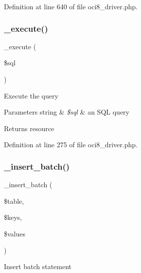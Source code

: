 Definition at line 640 of file oci8\+\_\+driver.\+php.

\mbox{\label{class_c_i___d_b__oci8__driver_a114ab675d89bf8324a41785fb475e86d}} 
\subsubsection{\texorpdfstring{\_execute()}{\_execute()}}
{\footnotesize\ttfamily \+\_\+execute (\begin{DoxyParamCaption}\item[{}]{\$sql }\end{DoxyParamCaption})\hspace{0.3cm}{\ttfamily [protected]}}

Execute the query


\begin{DoxyParams}[1]{Parameters}
string & {\em \$sql} & an S\+QL query \\
\hline
\end{DoxyParams}
\begin{DoxyReturn}{Returns}
resource 
\end{DoxyReturn}


Definition at line 275 of file oci8\+\_\+driver.\+php.

\mbox{\label{class_c_i___d_b__oci8__driver_a1978e1358c812587a46e242630365099}} 
\subsubsection{\texorpdfstring{\_insert\_batch()}{\_insert\_batch()}}
{\footnotesize\ttfamily \+\_\+insert\+\_\+batch (\begin{DoxyParamCaption}\item[{}]{\$table,  }\item[{}]{\$keys,  }\item[{}]{\$values }\end{DoxyParamCaption})\hspace{0.3cm}{\ttfamily [protected]}}

Insert batch statement


